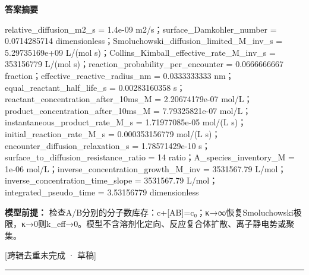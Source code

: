 \documentclass[UTF8,11pt,a4paper]{ctexart}
\begin{document}
\noindent\textbf{答案摘要}\par
relative\_diffusion\_m2\_s = 1.4e-09 m2/s；surface\_Damkohler\_number = 0.0714285714 dimensionless；Smoluchowski\_diffusion\_limited\_M\_inv\_s = 5.29735169e+09 L/(mol s)；Collins\_Kimball\_effective\_rate\_M\_inv\_s = 353156779 L/(mol s)；reaction\_probability\_per\_encounter = 0.0666666667 fraction；effective\_reactive\_radius\_nm = 0.0333333333 nm；equal\_reactant\_half\_life\_s = 0.00283160358 s；reactant\_concentration\_after\_10ms\_M = 2.20674179e-07 mol/L；product\_concentration\_after\_10ms\_M = 7.79325821e-07 mol/L；instantaneous\_product\_rate\_M\_s = 1.71977085e-05 mol/(L s)；initial\_reaction\_rate\_M\_s = 0.000353156779 mol/(L s)；encounter\_diffusion\_relaxation\_s = 1.78571429e-10 s；surface\_to\_diffusion\_resistance\_ratio = 14 ratio；A\_species\_inventory\_M = 1e-06 mol/L；inverse\_concentration\_growth\_M\_inv = 3531567.79 L/mol；inverse\_concentration\_time\_slope = 3531567.79 L/mol；integrated\_pseudo\_time = 3.53156779 dimensionless\par
\noindent\textbf{模型前提：}
检查A/B分别的分子数库存：c+[AB]=c₀；κ→∞恢复Smoluchowski极限，κ→0则k\_eff→0。模型不含溶剂化定向、反应复合体扩散、离子静电势或聚集。\par
\noindent\textcolor{red!65!black}{[跨辑去重未完成 · 草稿]} \par
\medskip\hrule\medskip
{}
\end{document}

